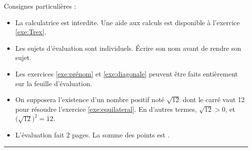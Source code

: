 

\SetDate[15/10/2025]
\reversemarginpar
\setlength{\marginparsep}{.5cm}

\newcommand{\exeI}{1}
\newcommand{\exeII}{2}
\newcommand{\exeIII}{3}
\newcommand{\exeIV}{4}
\newcommand{\exeV}{5}
\newcommand{\exeVI}{6}
\newcommand{\exeVII}{7}
\newcommand{\exeVIII}{8}
\newcommand{\exeIX}{9}
\newcommand{\exeX}{10}
\newcommand{\exeXI}{11}


\pagestyle{fancy}
\fancyhead[R]{\today}

\null\vspace{-30pt}
Consignes particulières : 
\begin{itemize}[label=$\bullet$]
	\item 
	La calculatrice est {interdite}. Une aide aux calculs est disponible à l'exercice \ref{exe:Trex}.
	\item
	Les sujets d'évaluation sont individuels. Écrire son nom avant de rendre son sujet.
	\item
	Les exercices \ref{exe:prénom} et \ref{exe:diagonale} peuvent être faits entièrement sur la feuille d'évaluation. 
	\item 
	On supposera l'existence d'un nombre positif noté $\sqrt{12}$ dont le carré vaut 12 pour résoudre l'exercice \ref{exe:equilateral}.
	En d'autres termes, $\sqrt{12} > 0$, et $\bigl(\sqrt{12}\bigr)^2 = 12$.
	\item
	L'évaluation fait 2 pages. La somme des points est .
\end{itemize}

\marginpar{[pts]}
\hrule











\newpage










\newpage
{}
\shipoutAnswer


